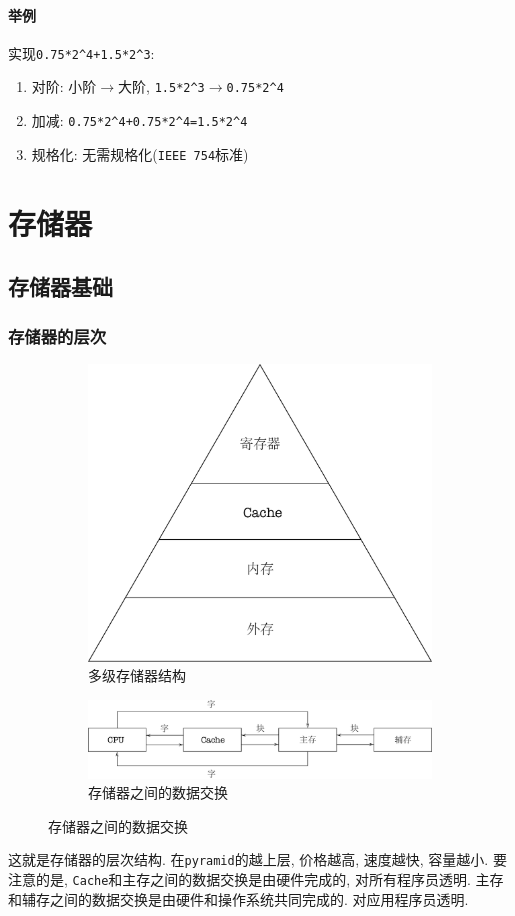 \subsubsection{举例}
实现\verb|0.75*2^4+1.5*2^3|:
\begin{enumerate}
\item 对阶: 小阶$ \rightarrow $大阶, \verb|1.5*2^3|$ \rightarrow $\verb|0.75*2^4|
\item 加减: \verb|0.75*2^4+0.75*2^4=1.5*2^4|
\item 规格化: 无需规格化(\verb|IEEE 754|标准)
\end{enumerate}
\chapter{存储器}
\section{存储器基础}
\subsection{存储器的层次}
\begin{figure}[H]
\centering
\begin{subfigure}{.48\textwidth}
\centering
\includegraphics[scale=.3]{img/figure11.pdf}
\caption{多级存储器结构}
\end{subfigure}
\begin{subfigure}{.48\textwidth}
\centering
\flushleft
\includegraphics[scale=.3]{img/figure12.pdf}
\caption{存储器之间的数据交换}
\end{subfigure}
\end{figure}
这就是存储器的层次结构. 在\verb|pyramid|的越上层, 价格越高, 速度越快, 容量越小. 要注意的是, \verb|Cache|和主存之间的数据交换是由硬件完成的, 对所有程序员透明. 主存和辅存之间的数据交换是由硬件和操作系统共同完成的. 对应用程序员透明.
